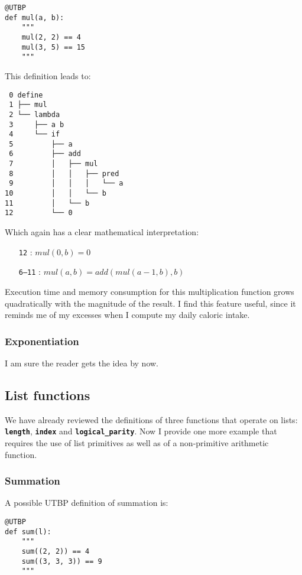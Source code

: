 \documentclass[12pt,twocolumn]{article}
\begin{document}
\begin{verbatim}
@UTBP
def mul(a, b):
    """
    mul(2, 2) == 4
    mul(3, 5) == 15
    """
\end{verbatim}

This definition leads to:

\begin{verbatim}
 0 define
 1 ├── mul
 2 └── lambda
 3     ├── a b
 4     └── if
 5         ├── a
 6         ├── add
 7         │   ├── mul
 8         │   │   ├── pred
 9         │   │   │   └── a
10         │   │   └── b
11         │   └── b
12         └── 0
\end{verbatim}

Which again has a clear mathematical interpretation:
\begin{itemize}
    \item[\texttt{12}]: $mul(0, b) = 0$
    \item[\texttt{6--11}]: $mul(a, b) = add(mul(a-1, b), b)$
\end{itemize}

Execution time and memory consumption for this multiplication function grows quadratically with the magnitude of the result. I find this feature useful, since it reminds me of my excesses when I compute my daily caloric intake.

\subsubsection{Exponentiation}
I am sure the reader gets the idea by now.

\subsection{List functions}
We have already reviewed the definitions of three functions that operate on lists: \texttt{\textbf{length}}, \texttt{\textbf{index}} and \texttt{\textbf{logical\_parity}}. Now I provide one more example that requires the use of list primitives as well as of a non-primitive arithmetic function.

\subsubsection{Summation}

A possible UTBP definition of summation is:

\begin{verbatim}
@UTBP
def sum(l):
    """
    sum((2, 2)) == 4
    sum((3, 3, 3)) == 9
    """
\end{verbatim}
\end{document}
